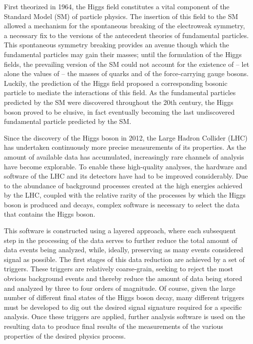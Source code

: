 \documentclass[12pt]{ucsddissertation}
\begin{document}
\begin{dissertationintroduction}
First theorized in 1964, the Higgs field constitutes a vital component of the Standard Model (SM) of particle physics. The insertion of this field to the SM allowed a mechanism for the spontaneous breaking of the electroweak symmetry, a necessary fix to the versions of the antecedent theories of fundamental particles. This spontaneous symmetry breaking provides an avenue though which the fundamental particles may gain their masses; until the formulation of the Higgs fields, the prevailing version of the SM could not account for the existence of -- let alone the values of -- the masses of quarks and of the force-carrying gauge bosons. Luckily, the prediction of the Higgs field proposed a corresponding bosonic particle to mediate the interactions of this field. As the fundamental particles predicted by the SM were discovered throughout the 20th century, the Higgs boson proved to be elusive, in fact eventually becoming the last undiscovered fundamental particle predicted by the SM. 

Since the discovery of the Higgs boson in 2012, the Large Hadron Collider (LHC) has undertaken continuously more precise measurements of its properties. As the amount of available data has accumulated, increasingly rare channels of analysis have become explorable. To enable these high-quality analyses, the hardware and software of the LHC and its detectors have had to be improved considerably. Due to the abundance of background processes created at the high energies achieved by the LHC, coupled with the relative rarity of the processes by which the Higgs boson is produced and decays, complex software is necessary to select the data that contains the Higgs boson.

This software is constructed using a layered approach, where each subsequent step in the processing of the data serves to further reduce the total amount of data events being analyzed, while, ideally, preserving as many events considered signal as possible. The first stages of this data reduction are achieved by a set of triggers. These triggers are relatively coarse-grain, seeking to reject the most obvious background events and thereby reduce the amount of data being stored and analyzed by three to four orders of magnitude. Of course, given the large number of different final states of the Higgs boson decay, many different triggers must be developed to dig out the desired signal signature required for a specific analysis. Once these triggers are applied, further analysis software is used on the resulting data to produce final results of the measurements of the various properties of the desired physics process. 


\end{dissertationintroduction}
\end{document}
